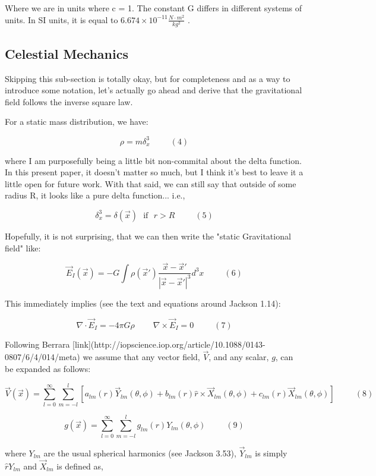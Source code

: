\documentclass {article}
\begin{document}
Where we are in units where c = 1. The constant G differs in different systems of units. In SI units, it is equal to $6.674 \times 10^{-11} \frac {N \cdot m^2}{kg^2}$ .

\subsection{Celestial Mechanics}

Skipping this sub-section is totally okay, but for completeness and as a way to introduce some notation, let's actually go ahead and derive that the gravitational field follows the inverse square law. 

For a static mass distribution, we have:

$$\rho = m \delta^3_x  ~~~~~~~~~~~ (4)$$

where I am purposefully being a little bit non-commital about the delta function. In this present paper, it doesn't matter so much, but I think it's best to leave it a little open for future work. With that said, we can still say that outside of some radius R, it looks like a pure delta function... i.e.,

$$\delta^3_x = \delta(\vec x) ~~~ \textrm{if} ~~~ r > R ~~~~~~~~~~~ (5)$$

Hopefully, it is not surprising, that we can then write the "static Gravitational field" like:

$$\vec{E}_I(\vec x) = -G \int \rho(\vec x') \frac {\vec x - \vec x'}{|\vec x - \vec x'|^3} d^3x ~~~~~~~~~~~ (6)$$

This immediately implies (see the text and equations around Jackson 1.14):

$$\nabla \cdot \vec{E}_I = -4 \pi G \rho ~~~~~~~~~~ \nabla \times \vec{E}_I = 0 ~~~~~~~~~~~ (7)$$

Following Berrara [link](http://iopscience.iop.org/article/10.1088/0143-0807/6/4/014/meta) we assume that any vector field, $\vec V$, and any scalar, $g$, can be expanded as follows:

$$\vec V (\vec x) = \sum_{l=0}^{\infty} \sum_{m=-l}^{l} \left[a_{lm}(r) \vec Y_{lm}(\theta, \phi) +b_{lm}(r) \hat r \times \vec X_{lm} (\theta, \phi) +c_{lm}(r) \vec X_{lm} (\theta, \phi) \right] ~~~~~~~~~~~ (8)$$

$$g(\vec x) = \sum_{l=0}^{\infty} \sum_{m=-l}^{l} g_{lm}(r) Y_{lm}(\theta, \phi) ~~~~~~~~~~~ (9)$$

where $Y_{lm}$ are the usual spherical harmonics (see Jackson 3.53), $\vec Y_{lm}$ is simply $\hat r Y_{lm}$  and $\vec X_{lm}$ is defined as,
\end{document}
